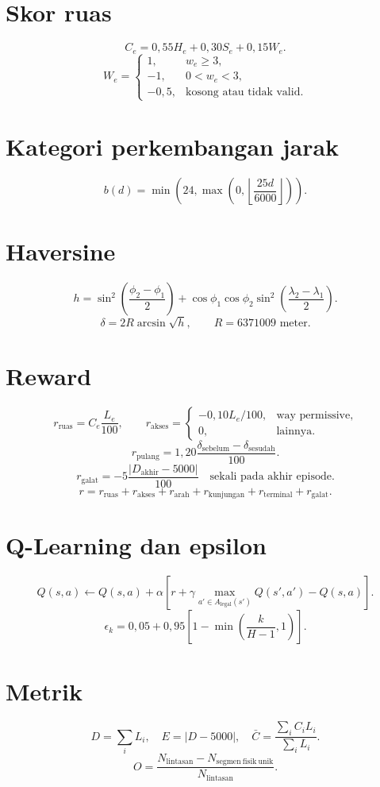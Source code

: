\documentclass[12pt]{article}
\begin{document}
\section*{Skor ruas}
\[ C_e=0{,}55H_e+0{,}30S_e+0{,}15W_e. \]
\[ W_e=\begin{cases}1,&w_e\geq3,\\-1,&0<w_e<3,\\-0{,}5,&\text{kosong atau tidak valid}.\end{cases} \]
\section*{Kategori perkembangan jarak}
\[ b(d)=\min\!\left(24,\max\!\left(0,\left\lfloor\frac{25d}{6000}\right\rfloor\right)\right). \]
\section*{Haversine}
\[ h=\sin^2\!\left(\frac{\phi_2-\phi_1}{2}\right)+\cos\phi_1\cos\phi_2\sin^2\!\left(\frac{\lambda_2-\lambda_1}{2}\right). \]
\[ \delta=2R\arcsin\sqrt{h},\qquad R=6371009\text{ meter}. \]
\section*{Reward}
\[ r_{\mathrm{ruas}}=C_e\frac{L_e}{100},\qquad r_{\mathrm{akses}}=\begin{cases}-0{,}10L_e/100,&\text{way permissive},\\0,&\text{lainnya}.\end{cases} \]
\[ r_{\mathrm{pulang}}=1{,}20\frac{\delta_{\mathrm{sebelum}}-\delta_{\mathrm{sesudah}}}{100}. \]
\[ r_{\mathrm{galat}}=-5\frac{|D_{\mathrm{akhir}}-5000|}{100}\quad\text{sekali pada akhir episode}. \]
\[ r=r_{\mathrm{ruas}}+r_{\mathrm{akses}}+r_{\mathrm{arah}}+r_{\mathrm{kunjungan}}+r_{\mathrm{terminal}}+r_{\mathrm{galat}}. \]
\section*{Q-Learning dan epsilon}
\[ Q(s,a)\leftarrow Q(s,a)+\alpha\left[r+\gamma\max_{a'\in A_{\mathrm{legal}}(s')}Q(s',a')-Q(s,a)\right]. \]
\[ \epsilon_k=0{,}05+0{,}95\left[1-\min\left(\frac{k}{H-1},1\right)\right]. \]
\section*{Metrik}
\[ D=\sum_iL_i,\quad E=|D-5000|,\quad \bar C=\frac{\sum_iC_iL_i}{\sum_iL_i}. \]
\[ O=\frac{N_{\mathrm{lintasan}}-N_{\mathrm{segmen\ fisik\ unik}}}{N_{\mathrm{lintasan}}}. \]
\end{document}
